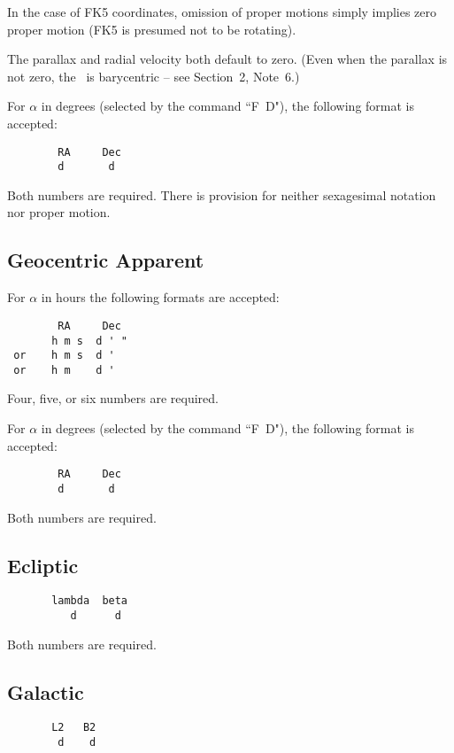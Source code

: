In the case of FK5 coordinates, omission of proper motions
simply implies zero proper motion (FK5 is presumed not to
be rotating).

The parallax and radial velocity both default to zero.  (Even when the
parallax is not zero, the \radec\ is barycentric -- see Section~2, Note~6.)

For $\alpha$ in degrees (selected by the command ``F~D"), the
following format is accepted:
\begin{verbatim}
        RA     Dec
        d       d
\end{verbatim}

Both numbers are required.  There is provision for neither sexagesimal
notation nor proper motion.

\subsection{Geocentric Apparent}

For $\alpha$ in hours the following formats are accepted:
\begin{verbatim}
        RA     Dec
       h m s  d ' "
 or    h m s  d '
 or    h m    d '
\end{verbatim}

Four, five, or six numbers are required.

For $\alpha$ in degrees (selected by the command ``F~D"), the
following format is accepted:
\begin{verbatim}
        RA     Dec
        d       d
\end{verbatim}

Both numbers are required.

\subsection{Ecliptic}

\begin{verbatim}
       lambda  beta
          d      d
\end{verbatim}

Both numbers are required.

\subsection{Galactic}

\begin{verbatim}
       L2   B2
        d    d
\end{verbatim}

